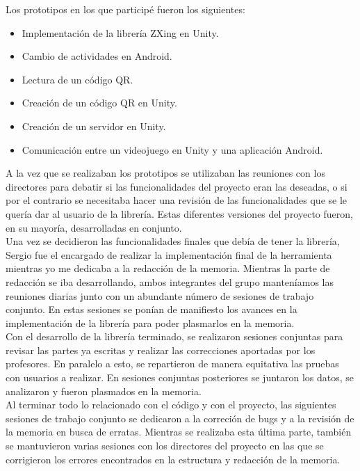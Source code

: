 Los prototipos en los que particip\'e fueron los siguientes:

\begin{itemize}
  \item  Implementaci\'on de la librer\'ia ZXing en Unity.
  \item Cambio de actividades en Android.
\item Lectura de un c\'odigo QR.
\item Creaci\'on de un c\'odigo QR en Unity.
\item Creaci\'on de un servidor en Unity.
\item Comunicaci\'on entre un videojuego en Unity y una aplicaci\'on Android.
\end{itemize}

A la vez que se realizaban los prototipos se utilizaban las reuniones con los directores para debatir si las funcionalidades del proyecto eran las deseadas, o si por el contrario se necesitaba hacer una revisi\'on de las funcionalidades que se le quer\'ia dar al usuario de la librer\'ia. Estas diferentes versiones del proyecto fueron, en su mayor\'ia, desarrolladas en conjunto.\\

Una vez se decidieron las funcionalidades finales que deb\'ia de tener la librer\'ia, Sergio fue el encargado de realizar la implementaci\'on final de la herramienta mientras yo me dedicaba a la redacci\'on de la memoria. Mientras la parte de redacci\'on se iba desarrollando, ambos integrantes del grupo manten\'iamos las reuniones diarias junto con un abundante n\'umero de sesiones de trabajo conjunto. En estas sesiones se pon\'ian de manifiesto los avances en la implementaci\'on de la librer\'ia para poder plasmarlos en la memoria.\\

Con el desarrollo de la librer\'ia terminado, se realizaron sesiones conjuntas para revisar las partes ya escritas y realizar las correcciones aportadas por los profesores. En paralelo a esto, se repartieron de manera equitativa las pruebas con usuarios a realizar. En sesiones conjuntas posteriores se juntaron los datos, se analizaron y fueron plasmados en la memoria.\\

Al terminar todo lo relacionado con el c\'odigo y con el proyecto, las siguientes sesiones de trabajo conjunto se dedicaron a la correci\'on de bugs y a la revisi\'on de la memoria en busca de erratas. Mientras se realizaba esta \'ultima parte, tambi\'en se mantuvieron varias sesiones con los directores del proyecto en las que se corrigieron los errores encontrados en la estructura y redacci\'on de la memoria.


